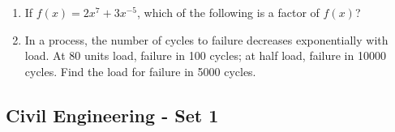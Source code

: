\documentclass[journal]{IEEEtran}
\begin{document}
\begin{enumerate}
\item If $f(x) = 2x^7 + 3x^{-5}$, which of the following is a factor of $f(x)$? \hfill {}
\begin{enumerate}
\end{enumerate}

\item In a process, the number of cycles to failure decreases exponentially with load. At $80$ units load, failure in 100 cycles; at half load, failure in 10000 cycles. Find the load for failure in 5000 cycles. \hfill {}
\begin{enumerate}
\end{enumerate}
\end{enumerate}

\subsection*{Civil Engineering - Set 1}
\end{document}
